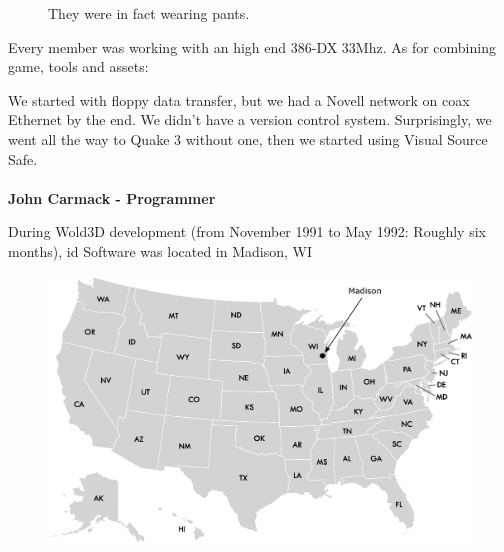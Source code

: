 \documentclass[book.tex]{subfiles}
\begin{document}
\begin{figure}[H]
\centering
\caption{They were in fact wearing pants.}
\label{fig:id_team_1993}
\end{figure}

Every member was working with an high end 386-DX 33Mhz. As for combining game, tools and assets:\\

 \begin{fancyquotes}
We started with floppy data transfer, but we had a Novell network on coax Ethernet by the end. We didn't have a version control system.  Surprisingly, we went all the way to Quake 3 without one, then we started using Visual Source Safe.\\
 \\
\textbf{John Carmack - Programmer}
\end{fancyquotes}







During Wold3D development (from November 1991 to May 1992: Roughly six months), id Software was located in Madison, WI
\begin{figure}[H]
\centering
 \includegraphics[width=\textwidth]{map/usa-id-software.eps}
 \end{figure}
\end{document}
